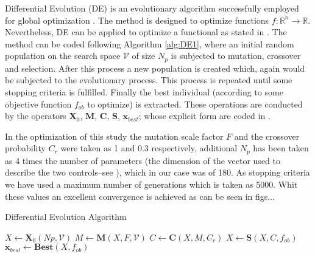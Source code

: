 
Differential Evolution (DE) \cite{Storn1997} is an evolutionary 
algorithm successfully employed for global optimization 
\cite{Bilal2020}. The method is designed to optimize functions 
$f:\mathbb{R}^n \to \mathbb{R}$. Nevertheless, DE can be applied to 
optimize a functional as stated in \cite{CANTUNetAl}. The method can be 
coded following Algorithm \ref{alg:DE1}, where an initial random 
population on the search space $\mathcal{V}$ of size $N_p$ is subjected 
to mutation, crossover and selection. After this process a new 
population is created which, again would be subjected to the 
evolutionary process. This process is repeated until some stopping 
criteria is fulfilled. Finally the best individual (according to some
objective function $f_{ob}$ to optimize) is extracted. These operations 
are conducted by the operators $\mathbf{X}_0$, $\mathbf{M}$, 
$\mathbf{C}$, $\mathbf{S}$, $\mathbf{x}_{best}$;  whose explicit form 
are coded in \cite{Penunuri2016}. 

In the optimization of this study 
the mutation scale factor $F$ and the crossover probability $C_r$ were
taken as 1 and 0.3 respectively, additional $N_p$ has been taken as 4 
times the number of parameters (the dimension of the vector used to
describe the two controls--see \cite{CANTUNetAl}), which in our case was 
of 180. As stopping criteria we have used a maximum number of 
generations which is taken as 5000. Whit these values an excellent 
convergence is achieved as can be seen in figs...

\begin{algorithm}[htb]
  \caption{Differential Evolution Algorithm}
  \label{alg:DE1}
  \begin{algorithmic}
    \State $X \leftarrow \mathbf{X}_0(Np,\mathcal{V})$
    \State $M \leftarrow \mathbf{M}(X,F,\mathcal{V})$
    \State $C \leftarrow \mathbf{C}(X,M,C_r)$
    \State $X \leftarrow \mathbf{S}(X,C,f_{ob})$
    \EndWhile
    \State $\mathbf{x}_{best} \leftarrow \mathbf{Best}(X, f_{ob})$
  \end{algorithmic}
\end{algorithm}

